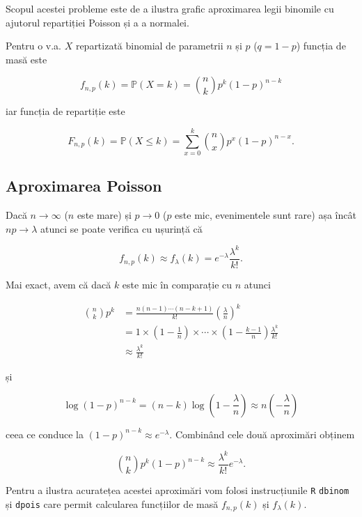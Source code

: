 \documentclass[]{article}
\begin{document}
Scopul acestei probleme este de a ilustra grafic aproximarea legii
binomile cu ajutorul repartiției Poisson și a a normalei.

Pentru o v.a. \(X\) repartizată binomial de parametrii \(n\) și \(p\)
(\(q = 1-p\)) funcția de masă este

\[
f_{n,p}(k)=\mathbb{P}(X=k)=\binom{n}{k}p^k(1-p)^{n-k}
\]

iar funcția de repartiție este

\[
F_{n,p}(k) = \mathbb{P}(X\leq k) = \sum_{x=0}^{k}\binom{n}{x}p^x(1-p)^{n-x}.
\]

\subsection{Aproximarea Poisson}\label{aproximarea-poisson}

Dacă \(n\to\infty\) (\(n\) este mare) și \(p\to 0\) (\(p\) este mic,
evenimentele sunt rare) așa încât \(np\to\lambda\) atunci se poate
verifica cu ușurință că

\[
f_{n,p}(k)\approx f_{\lambda}(k)=e^{-\lambda}\frac{\lambda^k}{k!}.
\]

Mai exact, avem că dacă \(k\) este mic în comparație cu \(n\) atunci

\begin{align*}
  \binom{n}{k}p^k &= \frac{n(n-1)\cdots(n-k+1)}{k!}\left(\frac{\lambda}{n}\right)^k \\
                  &= 1\times\left(1-\frac{1}{n}\right)\times\cdots\times\left(1-\frac{k-1}{n}\right)\frac{\lambda^k}{k!}\\
                  &\approx \frac{\lambda^k}{k!}
\end{align*}

și

\[
  \log(1-p)^{n-k} = (n-k)\log\left(1-\frac{\lambda}{n}\right)\approx n\left(-\frac{\lambda}{n}\right)
\]

ceea ce conduce la \((1-p)^{n-k}\approx e^{-\lambda}\). Combinând cele
două aproximări obținem

\[
  \binom{n}{k}p^k(1-p)^{n-k} \approx \frac{\lambda^k}{k!}e^{-\lambda}.
\]

Pentru a ilustra acuratețea acestei aproximări vom folosi instrucțiunile
\texttt{R} \texttt{dbinom} și \texttt{dpois} care permit calcularea
funcțiilor de masă \(f_{n,p}(k)\) și \(f_{\lambda}(k)\).
\end{document}
